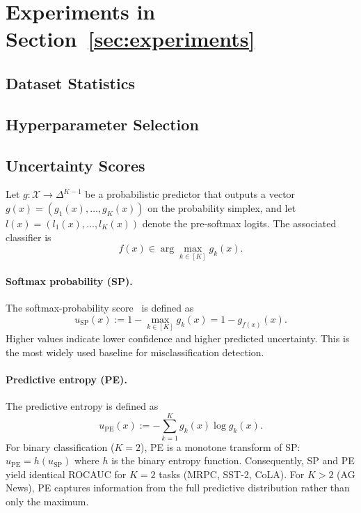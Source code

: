 \documentclass{article}
\theoremstyle{plain}
\theoremstyle{definition}
\theoremstyle{remark}
\begin{document}
\section{Experiments in Section~\ref{sec:experiments}}
\label{app:expe}

\subsection{Dataset Statistics}


\subsection{Hyperparameter Selection}


\subsection{Uncertainty Scores}
\label{app:uncertainty_scores}

Let $g:\mathcal X \to \Delta^{K-1}$ be a probabilistic predictor that outputs a vector
$g(x)=(g_1(x),\dots,g_K(x))$ on the probability simplex, and let $l(x) = (l_1(x),\dots,l_K(x))$ denote the pre-softmax logits. The associated classifier is
\[
f(x) \in \arg\max_{k\in[K]} g_k(x).
\]

\paragraph{Softmax probability (SP).}
The softmax-probability score~\citep{hendrycks2018baselinedetectingmisclassifiedoutofdistribution} is defined as
\[
u_{\mathrm{SP}}(x) := 1 - \max_{k\in[K]} g_k(x) = 1 - g_{f(x)}(x).
\]
Higher values indicate lower confidence and higher predicted uncertainty.
This is the most widely used baseline for misclassification detection.

\paragraph{Predictive entropy (PE).}
The predictive entropy is defined as
\[
u_{\mathrm{PE}}(x) := -\sum_{k=1}^K g_k(x) \log g_k(x).
\]
For binary classification ($K=2$), PE is a monotone transform of SP: $u_{\mathrm{PE}} = h(u_{\mathrm{SP}})$ where $h$ is the binary entropy function. Consequently, SP and PE yield identical ROCAUC for $K=2$ tasks (MRPC, SST-2, CoLA). For $K>2$ (AG News), PE captures information from the full predictive distribution rather than only the maximum.
\end{document}
